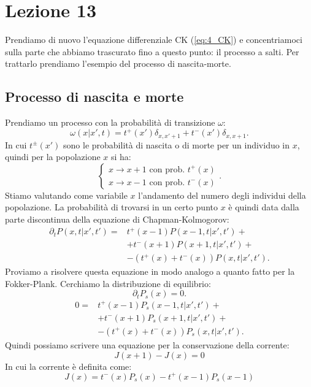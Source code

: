 \section{Lezione 13}%
\label{sub:Lezione 13}
Prendiamo di nuovo l'equazione differenziale CK (\ref{eq:4_CK}) e concentriamoci sulla parte che abbiamo trascurato fino a questo punto: il processo a salti. Per trattarlo prendiamo l'esempio del processo di nascita-morte.
\subsection{Processo di nascita e morte}%
\label{sub:Processo di nascita e morte}
Prendiamo un processo con la probabilità di transizione $\omega$:
\[
    \omega (x|x',t) = t^+(x') \delta_{x,x'+1} + t^-(x') \delta_{x,x+1}
.\] 
In cui $t^{\pm}(x')$ sono le probabilità di nascita o di morte per un individuo in $x$, quindi per la popolazione $x$ si ha:
\[
    \begin{cases}
	x\to x+1  \text{ con prob. } t^+(x) \\
	x\to x-1 \text{ con prob. } t^-(x) 
    \end{cases}
.\] 
Stiamo valutando come variabile $x$ l'andamento del numero degli individui della popolazione.
La probabilità di trovarsi in un certo punto $x$ è quindi data dalla parte discontinua della equazione di Chapman-Kolmogorov:
\[\begin{aligned}
    \partial_{t}P\left(x,t|x',t'\right) =& t^+(x-1) P\left(x-1, t|x',t'\right) +\\
					 & + t^-(x+1)P(x+1, t| x',t') +\\
					 & - \left(t^+(x) + t^-(x) \right)P\left(x,t|x',t'\right)
.\end{aligned}\]
Proviamo a risolvere questa equazione in modo analogo a quanto fatto per la Fokker-Plank. Cerchiamo la distribuzione di equilibrio:
\[
    \partial_{t}P_s(x) = 0
.\] 
\[\begin{aligned}
    0 =& t^+(x-1) P_s\left(x-1, t|x',t'\right) +\\
       & + t^-(x+1)P_s(x+1, t| x',t') +\\
       & - \left(t^+(x) + t^-(x) \right)P_s\left(x,t|x',t'\right)
.\end{aligned}\]
Quindi possiamo scrivere una equazione per la conservazione della corrente:
\begin{equation}
    J(x+1) - J(x) = 0 \label{eq:13_curr}
\end{equation}
In cui la corrente è definita come:
\begin{equation}
    J(x) = t^-(x) P_s(x) - t^+(x-1) P_s(x-1) \label{eq:13_def_curr}
\end{equation}

